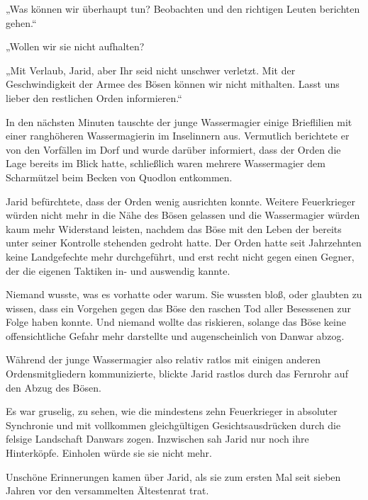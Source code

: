 „Was können wir überhaupt tun? Beobachten und den richtigen Leuten berichten gehen.“

„Wollen wir sie nicht aufhalten?

„Mit Verlaub, Jarid, aber Ihr seid nicht unschwer verletzt. Mit der Geschwindigkeit der Armee des Bösen können wir nicht mithalten. Lasst uns lieber den restlichen Orden informieren.“\bigskip







In den nächsten Minuten tauschte der junge Wassermagier einige Brieflilien mit einer ranghöheren Wassermagierin im Inselinnern aus. Vermutlich berichtete er von den Vorfällen im Dorf und wurde darüber informiert, dass der Orden die Lage bereits im Blick hatte, schließlich waren mehrere Wassermagier dem Scharmützel beim Becken von Quodlon entkommen.

Jarid befürchtete, dass der Orden wenig ausrichten konnte. Weitere Feuerkrieger würden nicht mehr in die Nähe des Bösen gelassen und die Wassermagier würden kaum mehr Widerstand leisten, nachdem das Böse mit den Leben der bereits unter seiner Kontrolle stehenden gedroht hatte. Der Orden hatte seit Jahrzehnten keine Landgefechte mehr durchgeführt, und erst recht nicht gegen einen Gegner, der die eigenen Taktiken in- und auswendig kannte.

Niemand wusste, was es vorhatte oder warum. Sie wussten bloß, oder glaubten zu wissen, dass ein Vorgehen gegen das Böse den raschen Tod aller Besessenen zur Folge haben konnte. Und niemand wollte das riskieren, solange das Böse keine offensichtliche Gefahr mehr darstellte und augenscheinlich von Danwar abzog.

Während der junge Wassermagier also relativ ratlos mit einigen anderen Ordensmitgliedern kommunizierte, blickte Jarid rastlos durch das Fernrohr auf den Abzug des Bösen.

Es war gruselig, zu sehen, wie die mindestens zehn Feuerkrieger in absoluter Synchronie und mit vollkommen gleichgültigen Gesichtsausdrücken durch die felsige Landschaft Danwars zogen. Inzwischen sah Jarid nur noch ihre Hinterköpfe. Einholen würde sie sie nicht mehr.\bigskip







Unschöne Erinnerungen kamen über Jarid, als sie zum ersten Mal seit sieben Jahren vor den versammelten Ältestenrat trat.


